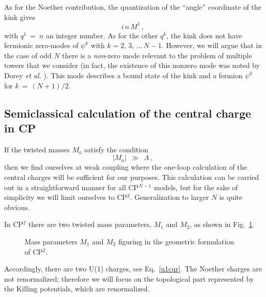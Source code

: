 \documentclass[epsfig,12pt]{article}
\def\beq{\begin{equation}}
\def\eeq{\end{equation}}
\def\beq{\begin{equation}}
\def\eeq{\end{equation}}
\begin{document}
	As for the Noether contribution, the quantization of the ``angle'' coordinate of the kink gives 
\beq
	i\, n\, M^1\,,
\eeq
	with $ q^1 ~=~ n $ an integer number.
	As for the other $ q^k $, the kink does not have fermionic zero-modes of $ \psi^k $ with $ k = 2,\, 3,\, ...\, N-1 $.
	However, we will argue that in the case of odd $ N $ there is a
	{\it non}-zero mode relevant to the problem of multiple towers that we consider (in fact, 
	the existence of this nonzero mode was noted by Dorey {\it et al.} \cite{Dorey:1999zk}).
	This mode describes a bound state of the kink and a fermion $ \psi^k $ for $ k \,=\, (N+1)/2 $.
     
\subsection[Semiclassical calculation of the central charge in CP$^2$]
	{Semiclassical calculation of the central charge in CP}
\label{semclas}
     
	If the twisted masses $M_a$ satisfy the condition
\beq
	| M_a | ~~\gg~~ \Lambda\,,
\eeq
	then we find ourselves at weak coupling where the one-loop calculation of the
	central charges will be sufficient for our purposes. 
	This calculation can be carried out in a straightforward manner for all CP$^{N-1}$ models, 
	but for the sake of simplicity we will limit ourselves to CP$^2$. 
	Generalization to larger $N$ is quite obvious. 
	
	In CP$^2$ there are two twisted mass parameters, $M_1$ and $M_2$, as shown in Fig.~\ref{fM}.
\begin{figure}
\begin{center}
\epsfxsize=5.0cm
\caption{Mass parameters $ M_1 $ and $ M_2 $ figuring in the geometric formulation of CP$^2$.}
\label{fM}
\end{center}
\end{figure}
	Accordingly, there are two U(1) charges, see Eq.~\eqref{u1cur}. 
	The Noether charges are not renormalized; 
	therefore we will focus on the topological part represented by the Killing potentials, 
	which are renormalized. 
\end{document}
